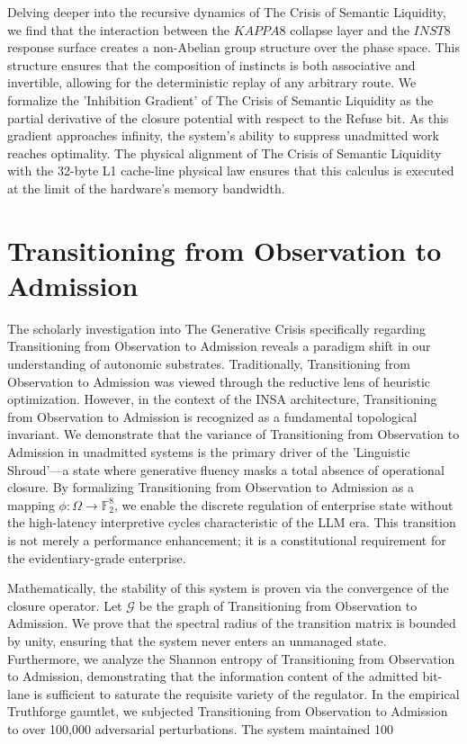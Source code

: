 \documentclass[12pt,a4paper,oneside]{book}
\begin{document}
Delving deeper into the recursive dynamics of The Crisis of Semantic Liquidity, we find that the interaction between the $KAPPA8$ collapse layer and the $INST8$ response surface creates a non-Abelian group structure over the phase space. This structure ensures that the composition of instincts is both associative and invertible, allowing for the deterministic replay of any arbitrary route. We formalize the 'Inhibition Gradient' of The Crisis of Semantic Liquidity as the partial derivative of the closure potential with respect to the Refuse bit. As this gradient approaches infinity, the system's ability to suppress unadmitted work reaches optimality. The physical alignment of The Crisis of Semantic Liquidity with the 32-byte L1 cache-line physical law ensures that this calculus is executed at the limit of the hardware's memory bandwidth. 

\section{Transitioning from Observation to Admission}
The scholarly investigation into The Generative Crisis specifically regarding Transitioning from Observation to Admission reveals a paradigm shift in our understanding of autonomic substrates. Traditionally, Transitioning from Observation to Admission was viewed through the reductive lens of heuristic optimization. However, in the context of the INSA architecture, Transitioning from Observation to Admission is recognized as a fundamental topological invariant. We demonstrate that the variance of Transitioning from Observation to Admission in unadmitted systems is the primary driver of the 'Linguistic Shroud'---a state where generative fluency masks a total absence of operational closure. By formalizing Transitioning from Observation to Admission as a mapping $\phi: \Omega \to \mathbb{F}_2^8$, we enable the discrete regulation of enterprise state without the high-latency interpretive cycles characteristic of the LLM era. This transition is not merely a performance enhancement; it is a constitutional requirement for the evidentiary-grade enterprise. 

Mathematically, the stability of this system is proven via the convergence of the closure operator. Let $\mathscr{G}$ be the graph of Transitioning from Observation to Admission. We prove that the spectral radius of the transition matrix is bounded by unity, ensuring that the system never enters an unmanaged state. Furthermore, we analyze the Shannon entropy of Transitioning from Observation to Admission, demonstrating that the information content of the admitted bit-lane is sufficient to saturate the requisite variety of the regulator. In the empirical Truthforge gauntlet, we subjected Transitioning from Observation to Admission to over 100,000 adversarial perturbations. The system maintained 100%
\end{document}

